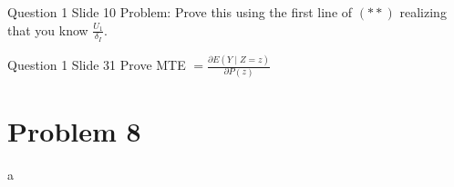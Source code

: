 \documentclass{article}
\begin{document}
\begin{problem}{Question 1 Slide 10}
Problem: Prove this using the first line of $(* *)$ realizing that you know $\frac{U_{1}}{\delta_{I}}$.
\end{problem}
\begin{solution}
\end{solution}

\begin{problem}{Question 1 Slide 31}
Prove MTE $=\frac{\partial E(Y \mid Z=z)}{\partial P(z)}$
\end{problem}
\begin{solution}
\end{solution}

\newpage

\section*{Problem 8}
 
\begin{problem}{a}
\end{problem}
\begin{solution}
\end{solution}
\end{document}
